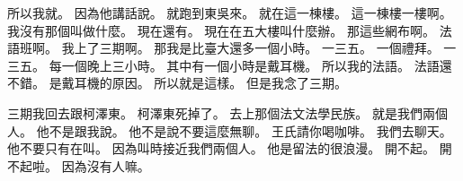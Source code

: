 \hypertarget{w01:cue:4069}{}所以我就。
\hypertarget{w01:cue:4070}{}因為他講話說。
\hypertarget{w01:cue:4071}{}就跑到東吳來。
\hypertarget{w01:cue:4072}{}就在這一棟樓。
\hypertarget{w01:cue:4073}{}這一棟樓一樓啊。
\hypertarget{w01:cue:4074}{}我沒有那個叫做什麼。
\hypertarget{w01:cue:4075}{}現在還有。
\hypertarget{w01:cue:4076}{}現在在五大樓叫什麼辦。
\hypertarget{w01:cue:4077}{}那這些網布啊。
\hypertarget{w01:cue:4078}{}法語班啊。
\hypertarget{w01:cue:4079}{}我上了三期啊。
\hypertarget{w01:cue:4080}{}那我是比臺大還多一個小時。
\hypertarget{w01:cue:4081}{}一三五。
\hypertarget{w01:cue:4082}{}一個禮拜。
\hypertarget{w01:cue:4083}{}一三五。
\hypertarget{w01:cue:4084}{}每一個晚上三小時。
\hypertarget{w01:cue:4085}{}其中有一個小時是戴耳機。
\hypertarget{w01:cue:4086}{}所以我的法語。
\hypertarget{w01:cue:4087}{}法語還不錯。
\hypertarget{w01:cue:4088}{}是戴耳機的原因。
\hypertarget{w01:cue:4089}{}所以就是這樣。
\hypertarget{w01:cue:4090}{}但是我念了三期。

\hypertarget{w01:cue:4091}{}三期我回去跟柯澤東。
\hypertarget{w01:cue:4092}{}柯澤東死掉了。
\hypertarget{w01:cue:4093}{}去上那個法文法學民族。
\hypertarget{w01:cue:4094}{}就是我們兩個人。
\hypertarget{w01:cue:4095}{}他不是跟我說。
\hypertarget{w01:cue:4096}{}他不是說不要這麼無聊。
\hypertarget{w01:cue:4097}{}王氏請你喝咖啡。
\hypertarget{w01:cue:4098}{}我們去聊天。
\hypertarget{w01:cue:4099}{}他不要只有在叫。
\hypertarget{w01:cue:4100}{}因為叫時接近我們兩個人。
\hypertarget{w01:cue:4101}{}他是留法的很浪漫。
\hypertarget{w01:cue:4102}{}開不起。
\hypertarget{w01:cue:4103}{}開不起啦。
\hypertarget{w01:cue:4104}{}因為沒有人嘛。

